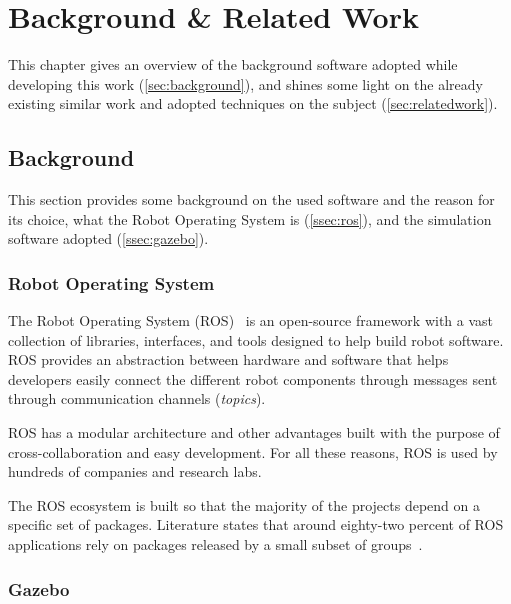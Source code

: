 \chapter{Background \& Related Work}
\label{chap:background}

This chapter gives an overview of the background software adopted while developing this work (\autoref{sec:background}), and shines some light on the already existing similar work and adopted techniques on the subject (\autoref{sec:relatedwork}).


\section{Background}
\label{sec:background}

This section provides some background on the used software and the reason for its choice, what the Robot Operating System is (\autoref{ssec:ros}), and the simulation software adopted (\autoref{ssec:gazebo}).


\subsection{Robot Operating System}
\label{ssec:ros}

The Robot Operating System (ROS)~\cite{quigley2009ros} is an open-source framework with a vast collection of libraries, interfaces, and tools designed to help build robot software. ROS provides an abstraction between hardware and software that helps developers easily connect the different robot components through messages sent through communication channels (\textit{topics}).

ROS has a modular architecture and other advantages built with the purpose of cross-collaboration and easy development. For all these reasons, ROS is used by hundreds of companies and research labs.

The ROS ecosystem is built so that the majority of the projects depend on a specific set of packages. Literature states that around eighty-two percent of ROS applications rely on packages released by a small subset of groups~\cite{9240632}.


\subsection{Gazebo}
\label{ssec:gazebo}

